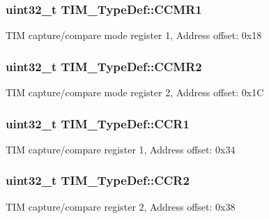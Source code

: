 \subsubsection[{\texorpdfstring{C\+C\+M\+R1}{CCMR1}}]{ uint32\+\_\+t T\+I\+M\+\_\+\+Type\+Def\+::\+C\+C\+M\+R1}\hypertarget{struct_t_i_m___type_def_a0f2291e7efdf3222689ef13e9be2ea4a}{}\label{struct_t_i_m___type_def_a0f2291e7efdf3222689ef13e9be2ea4a}
T\+IM capture/compare mode register 1, Address offset\+: 0x18 
\subsubsection[{\texorpdfstring{C\+C\+M\+R2}{CCMR2}}]{ uint32\+\_\+t T\+I\+M\+\_\+\+Type\+Def\+::\+C\+C\+M\+R2}\hypertarget{struct_t_i_m___type_def_aa8129ca70a2232c91c8cfcaf375249f6}{}\label{struct_t_i_m___type_def_aa8129ca70a2232c91c8cfcaf375249f6}
T\+IM capture/compare mode register 2, Address offset\+: 0x1C 
\subsubsection[{\texorpdfstring{C\+C\+R1}{CCR1}}]{ uint32\+\_\+t T\+I\+M\+\_\+\+Type\+Def\+::\+C\+C\+R1}\hypertarget{struct_t_i_m___type_def_a0dd9c06729a5eb6179c6d0d60faca7ed}{}\label{struct_t_i_m___type_def_a0dd9c06729a5eb6179c6d0d60faca7ed}
T\+IM capture/compare register 1, Address offset\+: 0x34 
\subsubsection[{\texorpdfstring{C\+C\+R2}{CCR2}}]{ uint32\+\_\+t T\+I\+M\+\_\+\+Type\+Def\+::\+C\+C\+R2}\hypertarget{struct_t_i_m___type_def_a4d1171e9a61538424b8ef1f2571986d0}{}\label{struct_t_i_m___type_def_a4d1171e9a61538424b8ef1f2571986d0}
T\+IM capture/compare register 2, Address offset\+: 0x38 
